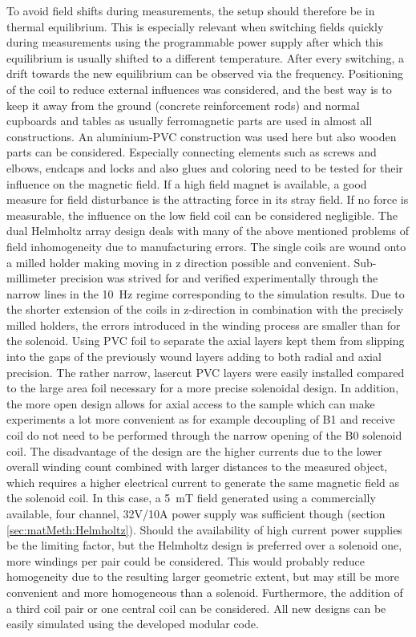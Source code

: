             To avoid field shifts during measurements, the setup should therefore be in thermal equilibrium. This is especially relevant when switching fields quickly during measurements using the programmable power supply after which this equilibrium is usually shifted to a different temperature. After every switching, a drift towards the new equilibrium can be observed via the frequency.
            Positioning of the coil to reduce external influences was considered, and the best way is to keep it away from the ground (concrete reinforcement rods) and normal cupboards and tables as usually ferromagnetic parts are used in almost all constructions. An aluminium-PVC construction was used here but also wooden parts can be considered. Especially connecting elements such as screws and elbows, endcaps and locks and also glues and coloring need to be tested for their influence on the magnetic field. If a high field magnet is available, a good measure for field disturbance is the attracting force in its stray field. If no force is measurable, the influence on the low field coil can be considered negligible.
            The dual Helmholtz array design deals with many of the above mentioned problems of field inhomogeneity due to manufacturing errors. The single coils are wound onto a milled holder making moving in z direction possible and convenient. Sub-millimeter precision was strived for and verified experimentally through the narrow lines in the \SI{10}{\hertz} regime corresponding to the simulation results. Due to the shorter extension of the coils in z-direction in combination with the precisely milled holders, the errors introduced in the winding process are smaller than for the solenoid. Using PVC foil to separate the axial layers kept them from slipping into the gaps of the previously wound layers adding to both radial and axial precision. The rather narrow, lasercut PVC layers were easily installed compared to the large area foil necessary for a more precise solenoidal design.
            In addition, the more open design allows for axial access to the sample which can make experiments a lot more convenient as for example decoupling of B1 and receive coil do not need to be performed through the narrow opening of the B0 solenoid coil. The disadvantage of the design are the higher currents due to the lower overall winding count combined with larger distances to the measured object, which requires a higher electrical current to generate the same magnetic field as the solenoid coil. In this case, a \SI{5}{\milli\tesla} field generated using a commercially available, four channel, 32V/10A power supply was sufficient though (section \ref{sec:matMeth:Helmholtz}). Should the availability of high current power supplies be the limiting factor, but the Helmholtz design is preferred over a solenoid one, more windings per pair could be considered. This would probably reduce homogeneity due to the resulting larger geometric extent, but may still be more convenient and more homogeneous than a solenoid. Furthermore, the addition of a third coil pair or one central coil can be considered. All new designs can be easily simulated using the developed modular code.
